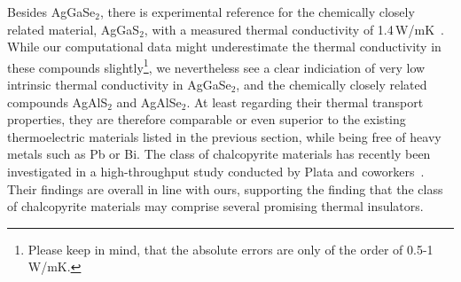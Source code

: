 Besides AgGaSe$_2$, there is experimental reference for the chemically closely related material, AgGaS$_2$, with a measured thermal conductivity of 1.4\,W/mK~\cite{Beasley.1994}.
While our computational data might underestimate the thermal conductivity in these compounds slightly\footnote{Please keep in mind, that the absolute errors are only of the order of 0.5-1\,W/mK.}, we nevertheless see a clear indiciation of very low intrinsic thermal conductivity in AgGaSe$_2$, and the chemically closely related compounds AgAlS$_2$ and AgAlSe$_2$. At least regarding their thermal transport properties, they are therefore comparable or even superior to the existing thermoelectric materials listed in the previous section, while being free of heavy metals such as Pb or Bi.
The class of chalcopyrite materials has recently been investigated in a high-throughput study conducted by Plata and coworkers~\cite{Plata.2021pre}. Their findings are overall in line with ours, supporting the finding that the class of chalcopyrite materials may comprise several promising thermal insulators.

